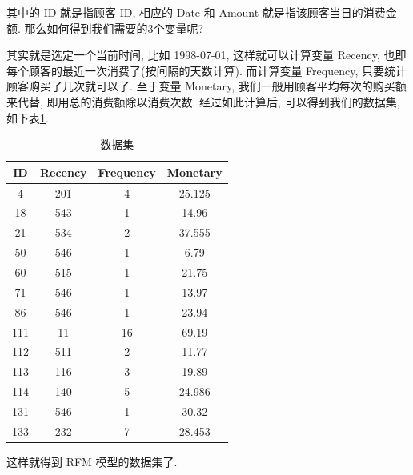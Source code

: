 \documentclass[a4paper,UTF8]{ctexart}
\theoremstyle{plain} \newtheorem{theorem}{定理}[section]
\theoremstyle{plain} \newtheorem{definition}{定义}[section]
\theoremstyle{plain} \newtheorem{lemma}{引理}[section]
\theoremstyle{plain} \newtheorem{proposition}{命题}[section]
\theoremstyle{plain} \newtheorem{example}{例}[section]
\theoremstyle{plain} \newtheorem{remark}{注}[section]
\theoremstyle{plain} \newtheorem{corollary}{推论}[section]
\begin{document}
其中的 ID 就是指顾客 ID, 相应的 Date 和 Amount 就是指该顾客当日的消费金额. 那么如何得到我们需要的$3$个变量呢? 

其实就是选定一个当前时间, 比如 1998-07-01, 这样就可以计算变量 Recency, 也即每个顾客的最近一次消费了(按间隔的天数计算). 而计算变量 Frequency, 只要统计顾客购买了几次就可以了. 至于变量 Monetary, 我们一般用顾客平均每次的购买额来代替, 即用总的消费额除以消费次数. 经过如此计算后, 可以得到我们的数据集, 如下表\ref{data}.
\begin{table}[!htb]
\centering
\caption{数据集}
\label{data}
\begin{tabular}{cccc}
	\hline
    \textbf{ID} & \textbf{Recency} & \textbf{Frequency} & \textbf{Monetary} \\
    \hline
	4 & 201 & 4 & 25.125 \\ 
	\hline
	18 & 543 & 1 & 14.96 \\ 
	\hline
	21 & 534 & 2 & 37.555 \\ 
	\hline
	50 & 546 & 1 & 6.79 \\ 
	\hline
	60 & 515 & 1 & 21.75 \\ 
	\hline
	71 & 546 & 1 & 13.97 \\ 
	\hline 
	86 & 546 & 1 & 23.94 \\ 
	\hline
	111 & 11 & 16 & 69.19 \\ 
	\hline 
	112 & 511 & 2 & 11.77 \\ 
	\hline 
	113 & 116 & 3 & 19.89 \\ 
	\hline 
	114 & 140 & 5 & 24.986 \\ 
	\hline 
	131 & 546 & 1 & 30.32 \\ 
	\hline
	133 & 232 & 7 & 28.453 \\
	\hline
\end{tabular}
\end{table}

这样就得到 RFM 模型的数据集了.
\end{document}

